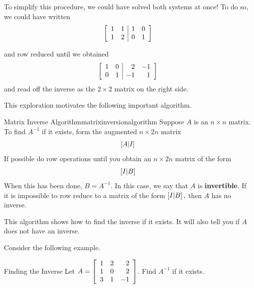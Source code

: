 To simplify this procedure, we could have solved both systems at once!
To do so, we could have written
\begin{equation*}
\left[
\begin{array}{rr|rr}
1 & 1 & 1 & 0 \\
1 & 2 & 0 & 1
\end{array}
\right]
\end{equation*}

and row reduced until we obtained
\begin{equation*}
\left[
\begin{array}{rr|rr}
1 & 0 & 2 & -1 \\
0 & 1 & -1 & 1
\end{array}
\right]
\end{equation*}
and read off the inverse as the $2\times 2$ matrix on the right side.

This exploration motivates the following important algorithm.

\begin{algorithm}{Matrix Inverse Algorithm}{matrixinversionalgorithm}
Suppose $A$ is an $n\times n$ matrix.  To find $A^{-1}$ if it exists, form
the augmented $n\times 2n$ matrix
\begin{equation*}
\left[ A|I\right]
\end{equation*}
If possible do row operations until you obtain an $n\times 2n$
matrix of the form
\begin{equation*}
\left[ I|B\right]  
\end{equation*}
When this has been done, $B=A^{-1}.$ In this case, we say that $A$ is \textbf{invertible}. 
If it is impossible to row reduce to a
matrix of the form $\left[ I|B\right] ,$ then $A$ has no inverse.
\end{algorithm}

This algorithm shows how to find the inverse if it exists. It will also tell you if
$A$ does not have an inverse. 

Consider the following example.

\begin{example}{Finding the Inverse}\label{exa:findinginverse}
Let $A=\left[
\begin{array}{rrr}
1 & 2 & 2 \\
1 & 0 & 2 \\
3 & 1 & -1
\end{array}
\right] $. Find $A^{-1}$ if it exists.
\end{example}

